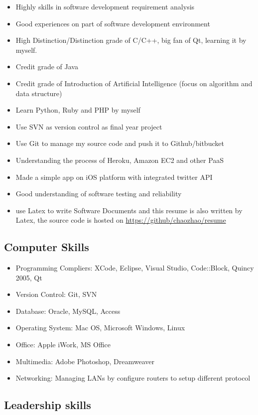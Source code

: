 \documentclass{article}
\begin{document}
	\begin{itemize}
	\item Highly skills in software development requirement analysis
	\item Good experiences on part of software development environment
	\item High Distinction/Distinction grade of C/C++, big fan of Qt, learning it by myself.
	\item Credit grade of Java
	\item Credit grade of Introduction of Artificial Intelligence (focus on algorithm and data structure)
	\item Learn Python, Ruby and PHP by myself
	\item Use SVN as version control as final year project
	\item Use Git to manage my source code and push it to Github/bitbucket
	\item Understanding the process of Heroku, Amazon EC2 and other PaaS
	\item Made a simple app on iOS platform with integrated twitter API
	\item Good understanding of software testing and reliability
	\item use Latex to write Software Documents and this resume is also written by Latex, the source code is hosted on \url{ https://github/chaozhao/resume}
	\end{itemize}

\subsection*{Computer Skills}
	\begin{itemize}
	\item Programming Compliers: XCode, Eclipse, Visual Studio, Code::Block, Quincy 2005, Qt
	\item Version Control: Git, SVN
	\item Database: Oracle, MySQL, Access
	\item Operating System: Mac OS, Microsoft Windows, Linux
	\item Office: Apple iWork, MS Office
	\item Multimedia: Adobe Photoshop, Dreamweaver
	\item Networking: Managing LANs by configure routers to setup different protocol
	\end{itemize}

\subsection*{Leadership skills}
	
\end{document}
